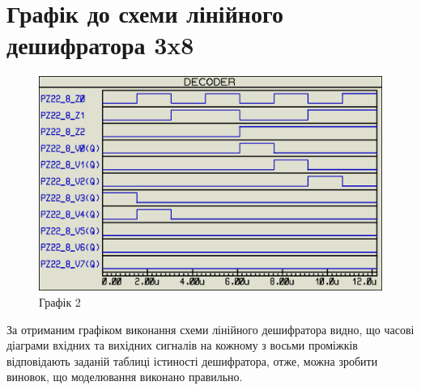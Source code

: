 \documentclass{article}
\begin{document}
\begin{normalsize}
\begin{figure}[H]
	\end{figure}

	\section*{Графік до схеми лінійного дешифратора 3x8}
	\begin{figure}[H]
		\centering
		\includegraphics[scale=0.34]{g2}	
		\caption{Графік 2}
	\end{figure}

	За отриманим графіком виконання схеми лінійного дешифратора видно, що часові діаграми вхідних та вихідних сигналів на кожному з восьми проміжків відповідають заданій таблиці істиності дешифратора, отже, можна зробити виновок, що моделювання виконано правильно.


\end{normalsize}
\end{document}
